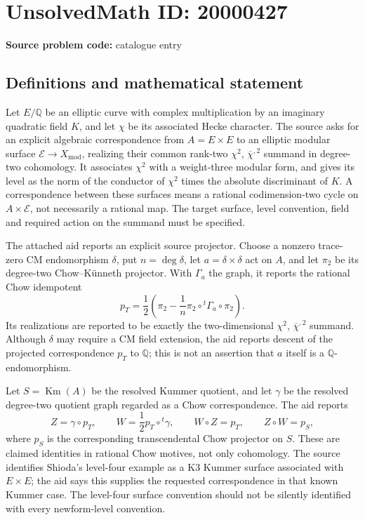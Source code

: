 \documentclass[11pt]{article}
\newcommand{\Q}{\mathbb{Q}}
\begin{document}
\section*{UnsolvedMath ID: 20000427}
\textbf{Source problem code:} catalogue entry
\subsection{Definitions and mathematical statement}
Let \(E/\Q\) be an elliptic curve with complex multiplication by an imaginary quadratic field \(K\), and let \(\chi\) be its associated Hecke character. The source asks for an explicit algebraic correspondence from \(A=E\times E\) to an elliptic modular surface \(\mathcal E\to X_{\mathrm{mod}}\), realizing their common rank-two \(\chi^2\), \(\overline\chi^{,2}\) summand in degree-two cohomology. It associates \(\chi^2\) with a weight-three modular form, and gives its level as the norm of the conductor of \(\chi^2\) times the absolute discriminant of \(K\). A correspondence between these surfaces means a rational codimension-two cycle on \(A\times\mathcal E\), not necessarily a rational map. The target surface, level convention, field and required action on the summand must be specified.

The attached aid reports an explicit source projector. Choose a nonzero trace-zero CM endomorphism \(\delta\), put \(n=\deg\delta\), let \(a=\delta\times\delta\) act on \(A\), and let \(\pi_2\) be its degree-two Chow--K\"unneth projector. With \(\Gamma_a\) the graph, it reports the rational Chow idempotent
\[
p_T=\frac12\left(\pi_2-\frac1n\pi_2\circ{}^t\Gamma_a\circ\pi_2\right).
\]
Its realizations are reported to be exactly the two-dimensional \(\chi^2\), \(\overline\chi^{,2}\) summand. Although \(\delta\) may require a CM field extension, the aid reports descent of the projected correspondence \(p_T\) to \(\Q\); this is not an assertion that \(a\) itself is a \(\Q\)-endomorphism.

Let \(S=\operatorname{Km}(A)\) be the resolved Kummer quotient, and let \(\gamma\) be the resolved degree-two quotient graph regarded as a Chow correspondence. The aid reports
\[
Z=\gamma\circ p_T,\qquad
W=\frac12p_T\circ{}^t\gamma,
\qquad W\circ Z=p_T,\qquad Z\circ W=p_S,
\]
where \(p_S\) is the corresponding transcendental Chow projector on \(S\). These are claimed identities in rational Chow motives, not only cohomology. The source identifies Shioda's level-four example as a K3 Kummer surface associated with \(E\times E\); the aid says this supplies the requested correspondence in that known Kummer case. The level-four surface convention should not be silently identified with every newform-level convention.
\end{document}
